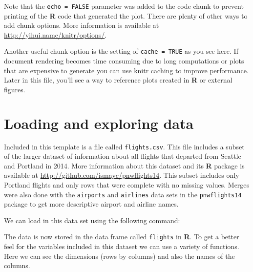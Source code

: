 \documentclass[12pt,twoside]{reedthesis}
\begin{document}
  Note that the \texttt{echo\ =\ FALSE} parameter was added to the code
  chunk to prevent printing of the \textbf{R} code that generated the
  plot. There are plenty of other ways to add chunk options. More
  information is available at \url{http://yihui.name/knitr/options/}.
  
  Another useful chunk option is the setting of \texttt{cache\ =\ TRUE} as
  you see here. If document rendering becomes time consuming due to long
  computations or plots that are expensive to generate you can use knitr
  caching to improve performance. Later in this file, you'll see a way to
  reference plots created in \textbf{R} or external figures.
  
  \section{Loading and exploring data}\label{loading-and-exploring-data}
  
  Included in this template is a file called \texttt{flights.csv}. This
  file includes a subset of the larger dataset of information about all
  flights that departed from Seattle and Portland in 2014. More
  information about this dataset and its \textbf{R} package is available
  at \url{http://github.com/ismayc/pnwflights14}. This subset includes
  only Portland flights and only rows that were complete with no missing
  values. Merges were also done with the \texttt{airports} and
  \texttt{airlines} data sets in the \texttt{pnwflights14} package to get
  more descriptive airport and airline names.
  
  We can load in this data set using the following command:
  
  \begin{Shaded}
  \begin{Highlighting}[]
  \StringTok{ }\NormalTok{(}\NormalTok{)}
  \end{Highlighting}
  \end{Shaded}
  
  The data is now stored in the data frame called \texttt{flights} in
  \textbf{R}. To get a better feel for the variables included in this
  dataset we can use a variety of functions. Here we can see the
  dimensions (rows by columns) and also the names of the columns.
  
  \begin{Shaded}
  \begin{Highlighting}[]
  \end{Highlighting}
  \end{Shaded}
  
\end{document}
